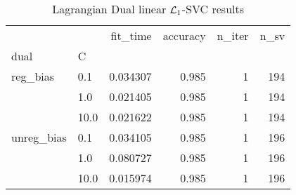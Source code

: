 \begin{table}[H]
\centering
\caption{Lagrangian Dual linear $\protect \mathcal{L}_1$-SVC results}
\label{linear_lagrangian_dual_l1_svc_cv_results}
\begin{tabular}{llrrrr}
\toprule
           &      &  fit\_time &  accuracy &  n\_iter &  n\_sv \\
dual & C &           &           &         &       \\
\midrule
reg\_bias & 0.1  &  0.034307 &     0.985 &       1 &   194 \\
           & 1.0  &  0.021405 &     0.985 &       1 &   194 \\
           & 10.0 &  0.021622 &     0.985 &       1 &   194 \\
unreg\_bias & 0.1  &  0.034105 &     0.985 &       1 &   196 \\
           & 1.0  &  0.080727 &     0.985 &       1 &   196 \\
           & 10.0 &  0.015974 &     0.985 &       1 &   196 \\
\bottomrule
\end{tabular}
\end{table}
